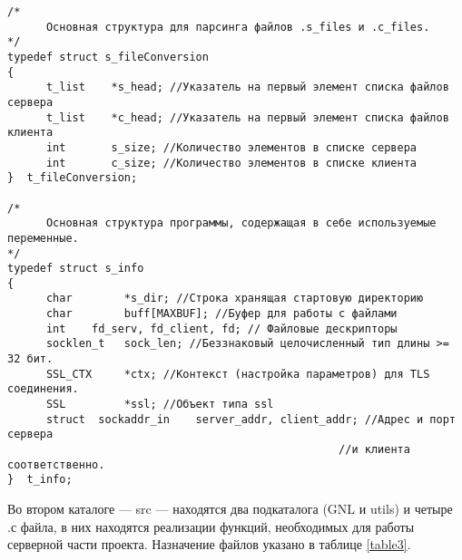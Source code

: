 \begin{verbatim}
/*
      Основная структура для парсинга файлов .s_files и .c_files.
*/
typedef struct s_fileConversion
{
      t_list	*s_head; //Указатель на первый элемент списка файлов сервера
      t_list	*c_head; //Указатель на первый элемент списка файлов клиента
      int	    s_size; //Количество элементов в списке сервера
      int	    c_size; //Количество элементов в списке клиента
}  t_fileConversion;

/*
      Основная структура программы, содержащая в себе используемые переменные.
*/
typedef struct s_info
{
      char        *s_dir; //Строка хранящая стартовую директорию
      char        buff[MAXBUF]; //Буфер для работы с файлами
      int	 fd_serv, fd_client, fd; // Файловые дескрипторы
      socklen_t   sock_len; //Беззнаковый целочисленный тип длины >= 32 бит. 
      SSL_CTX     *ctx; //Контекст (настройка параметров) для TLS соединения.
      SSL         *ssl; //Объект типа ssl
      struct  sockaddr_in    server_addr, client_addr; //Адрес и порт сервера
                                                   //и клиента соответственно.
}  t_info;
\end{verbatim}
\newpage
Во втором каталоге --- src --- находятся два подкаталога (GNL и utils) и четыре .с файла, в них находятся реализации функций, необходимых для работы серверной части проекта. Назначение файлов указано в таблице \ref{table3}.

